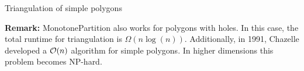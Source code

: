         \begin{breakablealgorithm}
            \caption{Triangulation of simple polygons}
            \label{alg:simple_triangulation}
            \begin{algorithmic}[1]
                    \EndFor
                    \State{}
                \EndProcedure
            \end{algorithmic}
        \end{breakablealgorithm}

        \textbf{Remark:} MonotonePartition also works for polygons with holes.  In this case, the total runtime for triangulation is $\Omega(n\log(n))$. Additionally, in 1991, Chazelle developed a $\mathcal{O}(n)$ algorithm for simple polygons. In higher dimensions this problem becomes NP-hard. 

